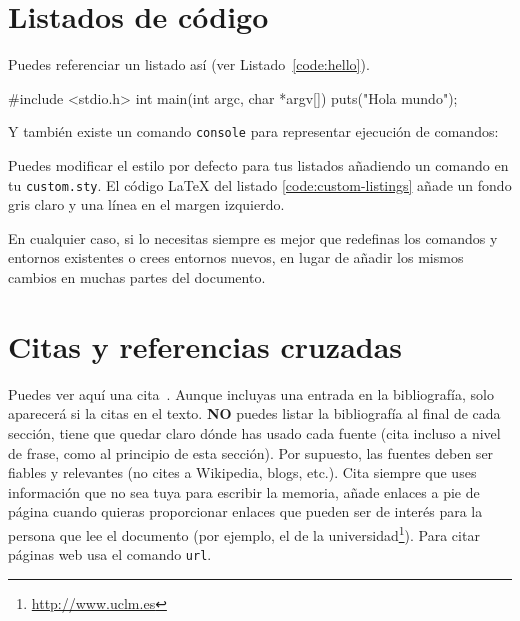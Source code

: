 \section{Listados de código}
\label{sec:listado}

Puedes referenciar un listado así (ver Listado~\ref{code:hello}).

\begin{listing}[
  float=ht,
  language = C,
  caption  = {«Hola mundo» en C},
  label    = code:hello]
#include <stdio.h>
int main(int argc, char *argv[]) {
    puts("Hola mundo\n");
}
\end{listing}

Y también existe un comando \texttt{console} para representar ejecución de comandos:


Puedes modificar el estilo por defecto para tus listados añadiendo un comando  en tu \texttt{custom.sty}. El código \LaTeX{} del listado \ref{code:custom-listings} añade un fondo gris claro y una línea en el margen izquierdo.

\begin{listing}[
  float=h!,
  caption  = {Personalizando los listados de código},
  label    = code:custom-listings]
\end{listing}

En cualquier caso, si lo necesitas siempre es mejor que redefinas los comandos y entornos existentes o crees entornos nuevos, en lugar de añadir los mismos cambios en muchas partes del documento.


\section{Citas y referencias cruzadas}

Puedes ver aquí una cita~\cite{design_patterns}. Aunque incluyas una entrada en la bibliografía, solo aparecerá si la citas en el texto. \textbf{NO} puedes listar la bibliografía al final de cada sección, tiene que quedar claro dónde has usado cada fuente (cita incluso a nivel de frase, como al principio de esta sección). Por supuesto, las fuentes deben ser fiables y relevantes (no cites a Wikipedia, blogs, etc.). Cita siempre que uses información que no sea tuya para escribir la memoria, añade enlaces a pie de página cuando quieras proporcionar enlaces que pueden ser de interés para la persona que lee el documento (por ejemplo, el de la universidad\footnote{\url{http://www.uclm.es}}). Para citar páginas web usa el comando \texttt{url}.


